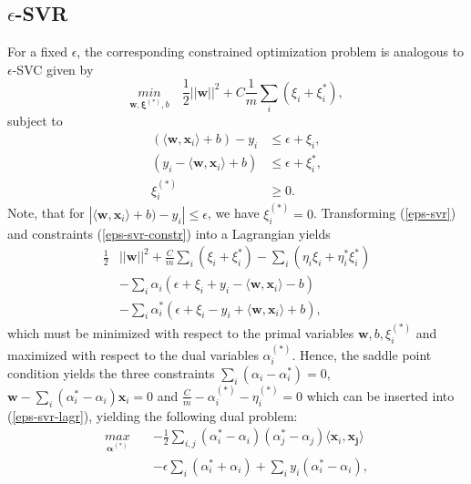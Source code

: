 \documentclass[a4paper,10pt]{article}
\begin{document}
\subsection{$\epsilon$-SVR}
For a fixed $\epsilon$, the corresponding constrained optimization problem is analogous to $\epsilon$-SVC given by
\begin{equation}
 \label{eps-svr}
 \underset{\mathbf{w}, \mathbf{\xi}^{(*)},b}{min}\quad \frac{1}{2}||\mathbf{w}||^2 + C \frac{1}{m}\sum_i (\xi_i+\xi_i^*),
\end{equation} 
subject to
\begin{equation}
 \label{eps-svr-constr}
 \begin{split}
  (\langle\mathbf{w},\mathbf{x}_i\rangle+b)-y_i &\le \epsilon + \xi_i,\\
  (y_i-\langle\mathbf{w},\mathbf{x}_i\rangle+b) &\le \epsilon + \xi_i^*,\\
  \xi_i^{(*)} &\ge 0.
 \end{split}
\end{equation} 
Note, that for $|\langle\mathbf{w},\mathbf{x}_i\rangle+b)-y_i| \le \epsilon$, we have $\xi_i^{(*)} = 0$. Transforming (\ref{eps-svr}) and constraints (\ref{eps-svr-constr}) into a Lagrangian yields
\begin{equation}
\label{eps-svr-lagr}
\begin{split}
 \frac{1}{2} &||\mathbf{w}||^2 + \frac{C}{m}\sum_i (\xi_i + \xi_i^*) - \sum_i (\eta_i\xi_i + \eta_i^*\xi_i^*)\\
             & -\sum_i \alpha_i(\epsilon + \xi_i + y_i - \langle\mathbf{w},\mathbf{x}_i\rangle - b)\\
             & -\sum_i \alpha_i^*(\epsilon + \xi_i - y_i + \langle\mathbf{w},\mathbf{x}_i\rangle + b),
\end{split}
\end{equation}
which must be minimized with respect to the primal variables $\mathbf{w},b,\xi_i^{(*)}$ and maximized with respect to the dual variables $\alpha_i^{(*)}$. Hence, the saddle point condition yields the three constraints $\sum_i(\alpha_i-\alpha_i^*)=0$, $\mathbf{w}-\sum_i(\alpha_i^*-\alpha_i)\mathbf{x}_i=0$ and $\frac{C}{m}-\alpha_i^{(*)} -\eta_i^{(*)}= 0$ which can be inserted into (\ref{eps-svr-lagr}), yielding the following dual problem:
\begin{equation}
 \label{eps-svr-dual}
 \begin{split}
  \underset{\bm{\alpha^{(*)}}}{max}\quad &-\frac{1}{2}\sum_{i,j}(\alpha_i^*-\alpha_i)(\alpha_j^*-\alpha_j)\langle\mathbf{x}_i,\mathbf{x_j}\rangle\\
  \quad &-\epsilon\sum_{i}(\alpha_i^*+\alpha_i)+\sum_{i}y_i(\alpha_i^*-\alpha_i),
 \end{split}
\end{equation} 
\end{document}
